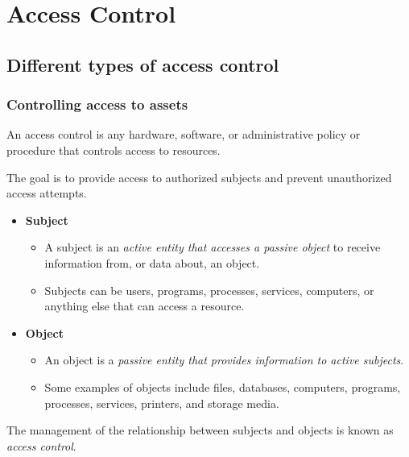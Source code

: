 

\section{Access Control}

\subsection{Different types of access control}

\subsubsection{Controlling access to assets}
An access control is any hardware, software, or administrative policy or procedure that controls access to resources.

The goal is to provide access to authorized subjects and prevent unauthorized access attempts.\\
\begin{itemize}
    \item \textbf{Subject}
    \begin{itemize}
        \item A subject is an \textit{active entity that accesses a passive object} to receive information from, or data about, an object.
        \item Subjects can be users, programs, processes, services, computers, or anything else that can access a resource.
    \end{itemize}
    \item \textbf{Object}
    \begin{itemize}
        \item An object is a \textit{passive entity that provides information to active subjects}.
        \item Some examples of objects include files, databases, computers, programs, processes, services, printers, and storage media.\\
    \end{itemize}
\end{itemize}

The management of the relationship between subjects and objects is known as \textit{access control}.

